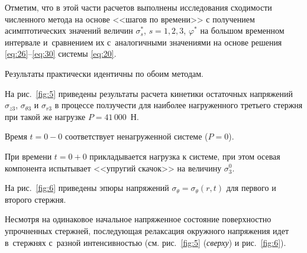 Отметим, что в этой части расчетов выполнены исследования сходимости численного метода на основе <<шагов по времени>> с получением асимптотических значений величин $\sigma_s^{\ast}$, $s=1,2,3$, $\varphi^{\ast}$ на большом временном интервале и~сравнением их с~аналогичными значениями на основе решения \eqref{eq:26}--\eqref{eq:30} системы \eqref{eq:20}.

Результаты практически идентичны по обоим методам.



На рис.~\ref{fig:5} приведены результаты расчета кинетики остаточных напряжений $\sigma_{z 3}$, $\sigma_{\theta 3}$ и $\sigma_{r 3}$ в процессе ползучести для наиболее нагруженного третьего стержня при такой же нагрузке $P = 41\,000 $~Н.

Время $t=0-0$ соответствует ненагруженной системе ($P = 0$).

При времени $t=0+0$ прикладывается нагрузка к системе, при этом осевая компонента испытывает <<упругий скачок>> на величину $\sigma_3^{0}$.

На рис.~\ref{fig:6} приведены эпюры напряжений $\sigma_\theta = \sigma_\theta (r, t)$ для первого и второго стержня.

Несмотря на одинаковое начальное напряженное состояние поверхностно упрочненных стержней, последующая релаксация окружного напряжения идет в~стержнях с~разной интенсивностью (см. рис.~\ref{fig:5} ({\sl сверху}) и рис.~\ref{fig:6}).














%









